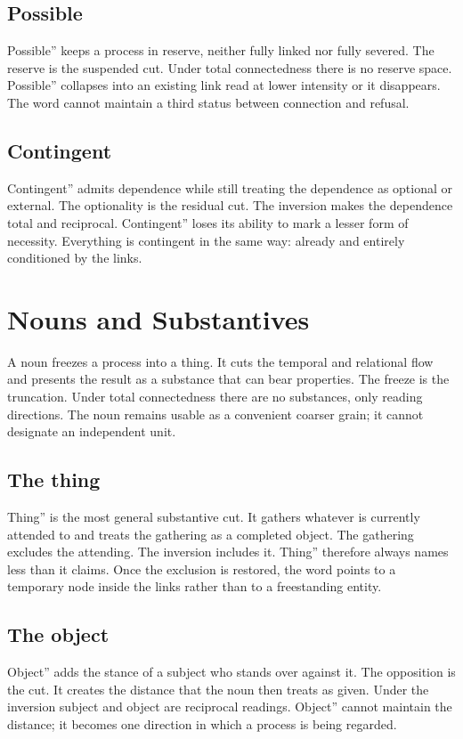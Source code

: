 \documentclass[11pt,a4paper]{article}
\begin{document}
\subsection{Possible} Possible'' keeps a process in reserve, neither fully linked nor fully severed. The reserve is the suspended cut. Under total connectedness there is no reserve space. Possible'' collapses into an existing link read at lower intensity or it disappears. The word cannot maintain a third status between connection and refusal.

\subsection{Contingent} Contingent'' admits dependence while still treating the dependence as optional or external. The optionality is the residual cut. The inversion makes the dependence total and reciprocal. Contingent'' loses its ability to mark a lesser form of necessity. Everything is contingent in the same way: already and entirely conditioned by the links.

\section{Nouns and Substantives}

A noun freezes a process into a thing. It cuts the temporal and relational flow and presents the result as a substance that can bear properties. The freeze is the truncation. Under total connectedness there are no substances, only reading directions. The noun remains usable as a convenient coarser grain; it cannot designate an independent unit.

\subsection{The thing} Thing'' is the most general substantive cut. It gathers whatever is currently attended to and treats the gathering as a completed object. The gathering excludes the attending. The inversion includes it. Thing'' therefore always names less than it claims. Once the exclusion is restored, the word points to a temporary node inside the links rather than to a freestanding entity.

\subsection{The object} Object'' adds the stance of a subject who stands over against it. The opposition is the cut. It creates the distance that the noun then treats as given. Under the inversion subject and object are reciprocal readings. Object'' cannot maintain the distance; it becomes one direction in which a process is being regarded.
\end{document}
